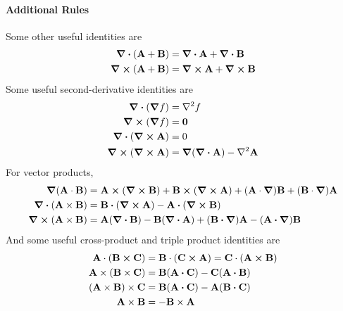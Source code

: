 			\paragraph{Additional Rules}
				Some other useful identities are
				\begin{align*}
					\div(\vb{A} + \vb{B}) &= \div \vb{A} + \div \vb{B}\\
					\curl(\vb{A} + \vb{B}) &= \curl \vb{A} + \curl \vb{B}
				\end{align*}
				Some useful second-derivative identities are
				\begin{align*}
					\div(\grad f) &= \lpc f\\
					\curl(\grad f) &= \vb{0}\\
					\div(\curl \vb{A}) &= 0\\
					\curl(\curl \vb{A})
						&= \grad(\div \vb{A}) - \lpc \vb{A}
				\end{align*}
				For vector products,
				\begin{align*}
					\grad(\vb{A}\cdot\vb{B})
						&=
							\vb{A}\cross(\curl\vb{B}) + \vb{B}\cross(\curl\vb{A})
							+ (\vb{A}\cdot\grad)\vb{B} + (\vb{B}\cdot\grad)\vb{A}\\
					\div(\vb{A}\times\vb{B})
						&= \vb{B}\vdot(\curl\vb{A})
							- \vb{A}\vdot(\curl\vb{B})\\
					\curl(\vb{A}\times\vb{B})
						&= \vb{A}(\div\vb{B})
							- \vb{B}(\div\vb{A})
							+ (\vb{B}\vdot\grad)\vb{A}
							- (\vb{A}\vdot\grad)\vb{B}
				\end{align*}
				And some useful cross-product and triple product identities are
				\begin{align*}
					\vb{A}\cdot(\vb{B}\cross\vb{C}) 
						&= \vb{B}\cdot(\vb{C}\cross\vb{A}) 
						 = \vb{C}\cdot(\vb{A}\cross\vb{B})\\
					\vb{A}\times(\vb{B}\times\vb{C})
						&= \vb{B}(\vb{A}\vdot\vb{C})
							- \vb{C}(\vb{A}\vdot\vb{B})\\
					(\vb{A}\times\vb{B})\times\vb{C}
						&= \vb{B}(\vb{A}\vdot\vb{C})
							- \vb{A}(\vb{B}\vdot\vb{C})\\
					\vb{A}\times\vb{B}
						&= -\vb{B}\times\vb{A}
				\end{align*}
				\newpage
